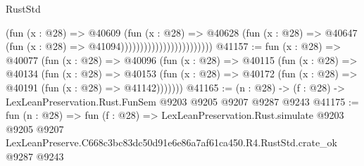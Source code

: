\begin{lexlean}{RustStd}
\begin{coremodule}
                                            (fun (x : @28) =>
                                            @40609
                                              (fun (x : @28) =>
                                              @40628
                                                (fun (x : @28) =>
                                                @40647
                                                  (fun (x : @28) => @41094))))))))))))))))))))))))
@41157 := fun (x : @28) =>
  @40077
    (fun (x : @28) =>
    @40096
      (fun (x : @28) =>
      @40115
        (fun (x : @28) =>
        @40134
          (fun (x : @28) =>
          @40153 (fun (x : @28) => @40172 (fun (x : @28) => @40191 (fun (x : @28) => @41142)))))))
@41165 := (n : @28) -> (f : @28) -> LexLeanPreservation.Rust.FunSem @9203 @9205 @9207 @9287 @9243
@41175 := fun (n : @28) =>
  fun (f : @28) =>
  LexLeanPreservation.Rust.simulate
    @9203
    @9205
    @9207
    LexLeanPreserve.C668c3bc83dc50d91e6e86a7af61ca450.R4.RustStd.crate_ok
    @9287
    @9243
\end{coremodule}
\end{lexlean}
